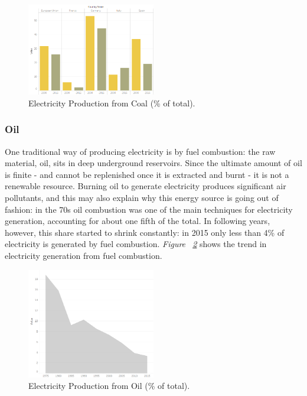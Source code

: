 \documentclass[a4paper,12pt]{book}
\begin{document}
\begin{figure}[tb]
\begin{center}
\captionsetup{justification=centering}
\includegraphics[width=0.5\textwidth]{Images/coal.png}
\caption{Electricity Production from Coal (\% of total). }
\label{fig:coal}
\end{center}
\end{figure}

\subsubsection*{Oil}

One traditional way of producing electricity is by fuel combustion: the raw material, oil, sits in deep underground reservoirs. Since the ultimate amount of oil is finite - and cannot be replenished once it is extracted and burnt - it is not a renewable resource. Burning oil to generate electricity produces significant air pollutants, and this may also explain why this energy source is going out of fashion: in the 70s oil combustion was one of the main techniques for electricity generation, accounting for about one fifth of the total. In following years, however, this share started to shrink constantly: in 2015 only less than 4\% of electricity is generated by fuel combustion. \textit{Figure ~\ref{fig:oil}} shows the trend in electricity generation from fuel combustion.

\begin{figure}[tb]
\begin{center}
\captionsetup{justification=centering}
\includegraphics[width=0.5\textwidth]{Images/oil.png}
\caption{Electricity Production from Oil (\% of total).}
\label{fig:oil}	
\end{center}
\end{figure}
 
\end{document}
